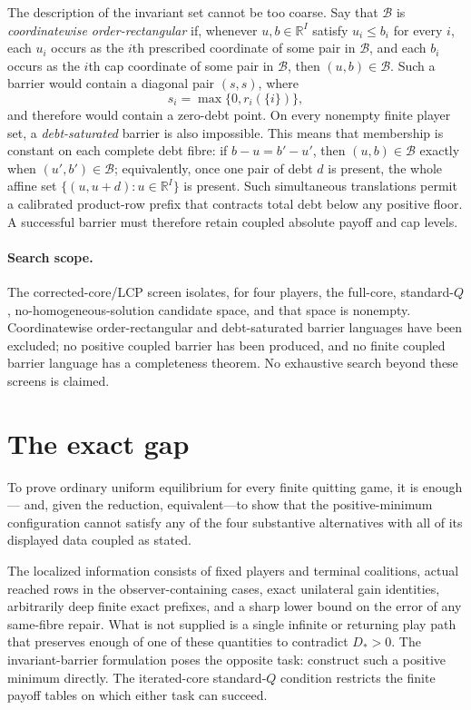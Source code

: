 \documentclass[11pt]{article}
\newcommand{\R}{\mathbb R}
\begin{document}
The description of the invariant set cannot be too coarse.  Say that
$\mathcal B$ is \emph{coordinatewise order-rectangular} if, whenever
$u,b\in\R^I$ satisfy $u_i\le b_i$ for every $i$, each $u_i$ occurs as the
$i$th prescribed coordinate of some pair in $\mathcal B$, and each $b_i$
occurs as the $i$th cap coordinate of some pair in $\mathcal B$, then
$(u,b)\in\mathcal B$.  Such a barrier would contain a diagonal pair $(s,s)$,
where
\[
 s_i=\max\{0,r_i(\{i\})\},
\]
and therefore would contain a zero-debt point.  On every nonempty finite
player set, a \emph{debt-saturated} barrier is also impossible.  This means
that membership is constant on each complete debt fibre: if $b-u=b'-u'$,
then $(u,b)\in\mathcal B$ exactly when $(u',b')\in\mathcal B$; equivalently,
once one pair of debt $d$ is present, the whole affine set
$\{(u,u+d):u\in\R^I\}$ is present.  Such simultaneous translations permit a
calibrated product-row prefix that contracts total debt below any positive
floor.  A successful barrier must therefore retain coupled absolute payoff
and cap levels.

\paragraph{Search scope.}
The corrected-core/LCP screen isolates, for four players, the full-core,
standard-$Q$, no-homogeneous-solution candidate space, and that space is
nonempty.  Coordinatewise order-rectangular and debt-saturated barrier
languages have been excluded; no positive coupled barrier has been produced,
and no finite coupled barrier language has a completeness theorem.  No
exhaustive search beyond these screens is claimed.

\section{The exact gap}

To prove
ordinary uniform equilibrium for every finite quitting game, it is enough---
and, given the reduction, equivalent---to show that the positive-minimum
configuration cannot satisfy any of the four substantive alternatives with all of its
displayed data coupled as stated.

The localized information consists of fixed players and terminal
coalitions, actual reached rows in the observer-containing cases, exact unilateral
gain identities, arbitrarily deep finite exact prefixes, and a sharp lower
bound on the error of any same-fibre repair.  What is not supplied is a
single infinite or returning play path that preserves enough of one of
these quantities to contradict $D_*>0$.  The invariant-barrier formulation
poses the opposite task: construct such a positive minimum directly.  The
iterated-core standard-$Q$ condition restricts the finite payoff tables on
which either task can succeed.
\end{document}
